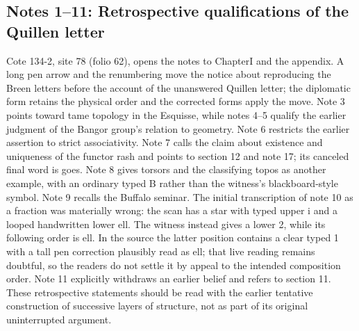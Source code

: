 \documentclass[10pt,oneside]{book}
\begin{document}
\subsection*{Notes 1--11: Retrospective qualifications of the Quillen letter}
Cote 134-2, site 78 (folio 62), opens the notes to ChapterI and the appendix. A long pen arrow and the renumbering move the notice about reproducing the Breen letters before the account of the unanswered Quillen letter; the diplomatic form retains the physical order and the corrected forms apply the move. Note 3 points toward tame topology in the Esquisse, while notes 4--5 qualify the earlier judgment of the Bangor group's relation to geometry. Note 6 restricts the earlier assertion to strict associativity. Note 7 calls the claim about existence and uniqueness of the functor rash and points to section 12 and note 17; its canceled final word is goes. Note 8 gives torsors and the classifying topos as another example, with an ordinary typed B rather than the witness's blackboard-style symbol. Note 9 recalls the Buffalo seminar. The initial transcription of note 10 as a fraction was materially wrong: the scan has a star with typed upper i and a looped handwritten lower ell. The witness instead gives a lower 2, while its following order is ell. In the source the latter position contains a clear typed 1 with a tall pen correction plausibly read as ell; that live reading remains doubtful, so the readers do not settle it by appeal to the intended composition order. Note 11 explicitly withdraws an earlier belief and refers to section 11. These retrospective statements should be read with the earlier tentative construction of successive layers of structure, not as part of its original uninterrupted argument.
\end{document}
